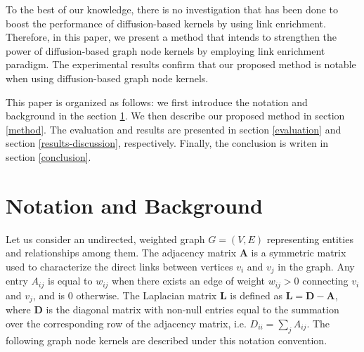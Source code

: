 \documentclass{article}
\begin{document}
To the best of our knowledge, there is no investigation that has been done to boost the performance of diffusion-based kernels by using link enrichment. Therefore, in this paper, we present a method that intends to strengthen the power of diffusion-based graph node kernels by employing link enrichment paradigm. The experimental results confirm that our proposed method is notable when using diffusion-based graph node kernels.

This paper is organized as follows: we first introduce the notation and background in the section \ref{background}. We then describe our proposed method in section \ref{method}. The evaluation and results are presented in section \ref{evaluation} and section \ref{results-discussion}, respectively. Finally, the conclusion is writen in section \ref{conclusion}.

\section{Notation and Background}
\label{background}
Let us consider an undirected, weighted graph $G = (V, E)$ representing entities and relationships among them. The adjacency matrix $\textbf{A}$ is a symmetric matrix used to characterize the direct links between vertices $v_{i}$ and $v_{j}$ in the graph. Any entry $A_{ij}$ is equal to $w_{ij}$ when there exists an edge of weight $w_{ij}>0$ connecting $v_{i}$ and $v_{j}$, and is 0 otherwise. The Laplacian matrix $\textbf{L}$ is defined as $\textbf{L} = \textbf{D}-\textbf{A}$, where $\textbf{D}$ is the diagonal matrix with non-null entries equal to the summation over the corresponding row of the adjacency matrix, i.e. $D_{ii}=\sum_j A_{ij}$. The following graph node kernels are described under this notation convention. 
\end{document}

